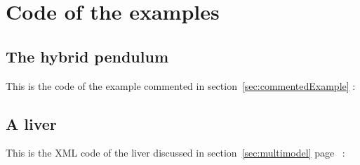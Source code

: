 \section{Code of the examples}
\subsection{The hybrid pendulum}\label{cpp:hybrid}
This is the code of the example commented in section~\ref{sec:commentedExample} :

\subsection{A liver}\label{xml:liver}
This is the XML code of the liver discussed in section~\ref{sec:multimodel} page~\pageref{bla:liver} :

% 
%
% 
%
% 
%
% 
